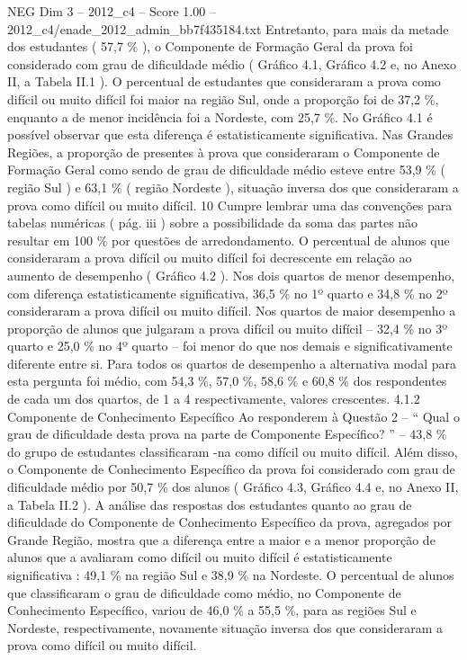 \begin{textsample}{NEG Dim 3 – 2012\_c4 – Score 1.00 – 2012\_c4/enade\_2012\_admin\_bb7f435184.txt}
Entretanto, para mais da metade dos estudantes ( 57,7 \% ), o Componente de Formação Geral da prova foi considerado com grau de dificuldade médio ( Gráfico 4.1, Gráfico 4.2 e, no Anexo II, a Tabela II.1 ).
O percentual de estudantes que consideraram a prova como difícil ou muito difícil foi maior na região Sul, onde a proporção foi de 37,2 \%, enquanto a de menor incidência foi a Nordeste, com 25,7 \%.
No Gráfico 4.1 é possível observar que esta diferença é estatisticamente significativa.
Nas Grandes Regiões, a proporção de presentes à prova que consideraram o Componente de Formação Geral como sendo de grau de dificuldade médio esteve entre 53,9 \% ( região Sul ) e 63,1 \% ( região Nordeste ), situação inversa dos que consideraram a prova como difícil ou muito difícil. 10 Cumpre lembrar uma das convenções para tabelas numéricas ( pág. iii ) sobre a possibilidade da soma das partes não resultar em 100 \% por questões de arredondamento.
O percentual de alunos que consideraram a prova difícil ou muito difícil foi decrescente em relação ao aumento de desempenho ( Gráfico 4.2 ).
Nos dois quartos de menor desempenho, com diferença estatisticamente significativa, 36,5 \% no 1º quarto e 34,8 \% no 2º consideraram a prova difícil ou muito difícil.
Nos quartos de maior desempenho a proporção de alunos que julgaram a prova difícil ou muito difícil – 32,4 \% no 3º quarto e 25,0 \% no 4º quarto – foi menor do que nos demais e significativamente diferente entre si.
Para todos os quartos de desempenho a alternativa modal para esta pergunta foi médio, com 54,3 \%, 57,0 \%, 58,6 \% e 60,8 \% dos respondentes de cada um dos quartos, de 1 a 4 respectivamente, valores crescentes. 4.1.2 Componente de Conhecimento Específico Ao responderem à Questão 2 – “ Qual o grau de dificuldade desta prova na parte de Componente Específico? ” – 43,8 \% do grupo de estudantes classificaram -na como difícil ou muito difícil.
Além disso, o Componente de Conhecimento Específico da prova foi considerado com grau de dificuldade médio por 50,7 \% dos alunos ( Gráfico 4.3, Gráfico 4.4 e, no Anexo II, a Tabela II.2 ).
A análise das respostas dos estudantes quanto ao grau de dificuldade do Componente de Conhecimento Específico da prova, agregados por Grande Região, mostra que a diferença entre a maior e a menor proporção de alunos que a avaliaram como difícil ou muito difícil é estatisticamente significativa : 49,1 \% na região Sul e 38,9 \% na Nordeste.
O percentual de alunos que classificaram o grau de dificuldade como médio, no Componente de Conhecimento Específico, variou de 46,0 \% a 55,5 \%, para as regiões Sul e Nordeste, respectivamente, novamente situação inversa dos que consideraram a prova como difícil ou muito difícil.

\end{textsample}
